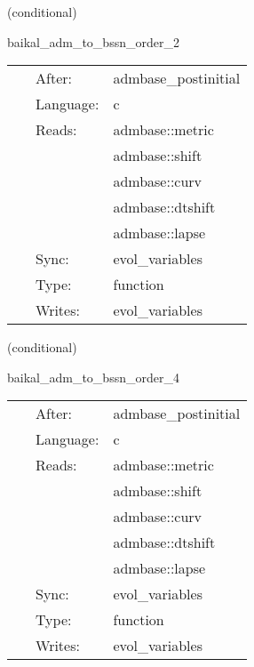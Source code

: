 \vspace{5mm}

   (conditional) 

\hspace{5mm} baikal\_adm\_to\_bssn\_order\_2 

\hspace{5mm}{\it convert initial data into bssn variables } 


\hspace{5mm}

 \begin{tabular*}{160mm}{cll} 
~ & After:  & admbase\_postinitial \\ 
~ & Language:  & c \\ 
~ & Reads:  & admbase::metric \\ 
~& ~ &admbase::shift\\ 
~& ~ &admbase::curv\\ 
~& ~ &admbase::dtshift\\ 
~& ~ &admbase::lapse\\ 
~ & Sync:  & evol\_variables \\ 
~ & Type:  & function \\ 
~ & Writes:  & evol\_variables \\ 
\end{tabular*} 


\vspace{5mm}

   (conditional) 

\hspace{5mm} baikal\_adm\_to\_bssn\_order\_4 

\hspace{5mm}{\it convert initial data into bssn variables } 


\hspace{5mm}

 \begin{tabular*}{160mm}{cll} 
~ & After:  & admbase\_postinitial \\ 
~ & Language:  & c \\ 
~ & Reads:  & admbase::metric \\ 
~& ~ &admbase::shift\\ 
~& ~ &admbase::curv\\ 
~& ~ &admbase::dtshift\\ 
~& ~ &admbase::lapse\\ 
~ & Sync:  & evol\_variables \\ 
~ & Type:  & function \\ 
~ & Writes:  & evol\_variables \\ 
\end{tabular*} 



